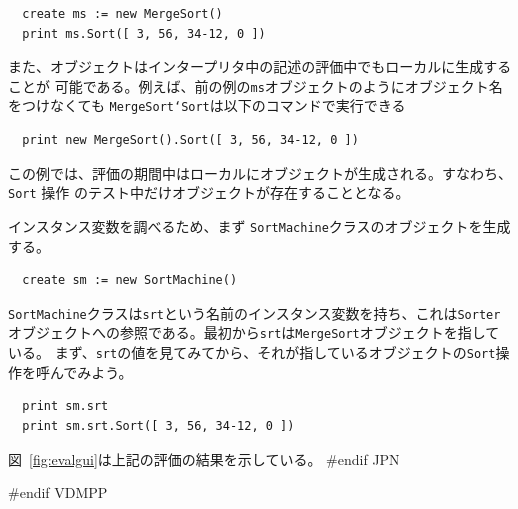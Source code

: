 \documentclass[\pformat,12pt]{article}
\begin{document}
\begin{verbatim}
  create ms := new MergeSort()
  print ms.Sort([ 3, 56, 34-12, 0 ])
\end{verbatim}

また、オブジェクトはインタープリタ中の記述の評価中でもローカルに生成することが
可能である。例えば、前の例の{\tt ms}オブジェクトのようにオブジェクト名をつけなくても
{\tt MergeSort`Sort}は以下のコマンドで実行できる 

\begin{verbatim}
  print new MergeSort().Sort([ 3, 56, 34-12, 0 ])
\end{verbatim}

この例では、評価の期間中はローカルにオブジェクトが生成される。すなわち、{\tt Sort} 操作
のテスト中だけオブジェクトが存在することとなる。

インスタンス変数を調べるため、まず {\tt SortMachine}クラスのオブジェクトを生成する。

\begin{verbatim}
  create sm := new SortMachine()
\end{verbatim}

{\tt SortMachine}クラスは{\tt srt}という名前のインスタンス変数を持ち、これは{\tt Sorter}
オブジェクトへの参照である。最初から{\tt srt}は{\tt MergeSort}オブジェクトを指している。
まず、{\tt srt}の値を見てみてから、それが指しているオブジェクトの{\tt Sort}操作を呼んでみよう。

\begin{verbatim}
  print sm.srt
  print sm.srt.Sort([ 3, 56, 34-12, 0 ])
\end{verbatim}

図~\ref{fig:evalgui}は上記の評価の結果を示している。
#endif JPN

#endif VDMPP
\end{document}
